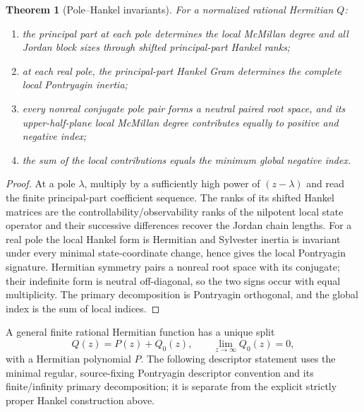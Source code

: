 \documentclass[11pt]{article}
\newtheorem{theorem}{Theorem}[section]
\theoremstyle{definition}
\theoremstyle{remark}
\theoremstyle{definition}
\theoremstyle{remark}
\begin{document}
\begin{theorem}[Pole--Hankel invariants]
\label{thm:supp-pole-Hankel}
For a normalized rational Hermitian $Q$:
\begin{enumerate}[label=\textup{(P\arabic*)},leftmargin=3em]
\item the principal part at each pole determines the local McMillan degree and all
      Jordan block sizes through shifted principal-part Hankel ranks;
\item at each real pole, the principal-part Hankel Gram determines the complete
      local Pontryagin inertia;
\item every nonreal conjugate pole pair forms a neutral paired root space, and its
      upper-half-plane local McMillan degree contributes equally to positive and
      negative index;
\item the sum of the local contributions equals the minimum global negative index.
\end{enumerate}
\end{theorem}

\begin{proof}
At a pole $\lambda$, multiply by a sufficiently high power of $(z-\lambda)$ and
read the finite principal-part coefficient sequence.  The ranks of its shifted
Hankel matrices are the controllability/observability ranks of the nilpotent local
state operator and their successive differences recover the Jordan chain lengths.
For a real pole the local Hankel form is Hermitian and Sylvester inertia is invariant
under every minimal state-coordinate change, hence gives the local Pontryagin
signature.  Hermitian symmetry pairs a nonreal root space with its conjugate; their
indefinite form is neutral off-diagonal, so the two signs occur with equal
multiplicity.  The primary decomposition is Pontryagin orthogonal, and the global
index is the sum of local indices.
\end{proof}

A general finite rational Hermitian function has a unique split
\begin{equation}
Q(z)=P(z)+Q_0(z),
\qquad
\lim_{z\to\infty}Q_0(z)=0,
\label{eq:supp-rational-split}
\end{equation}
with a Hermitian polynomial $P$.  The following descriptor statement uses
the minimal regular, source-fixing Pontryagin descriptor convention and its
finite/infinity primary decomposition; it is separate from the explicit
strictly proper Hankel construction above.
\end{document}
